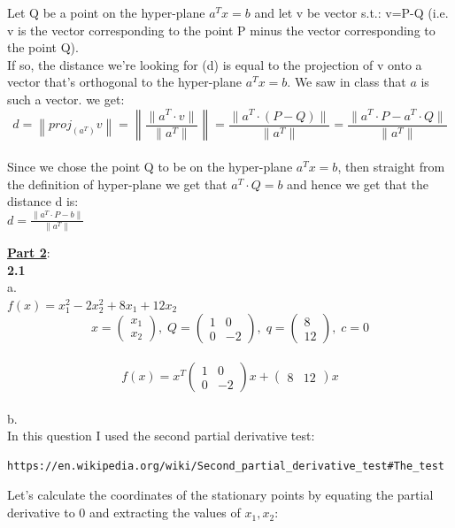 \documentclass[fleqn]{article}
\begin{document}
Let Q be a point on the hyper-plane $a^Tx=b$ and let v be vector s.t.: v=P-Q (i.e. v is the vector corresponding to the point P minus the vector corresponding to the point Q). \\
If so, the distance we're looking for (d) is equal to the projection of v onto a vector that's orthogonal to the hyper-plane $a^Tx=b$. We saw in class that $a$ is such a vector. we get: \\
\[
d = \left\| proj_{(a^T)}v\right\| = \left\| \frac{\|a^T \cdot v\|}{\|a^T\|} \right\|
=
\frac{\|a^T \cdot (P-Q)\|}{\|a^T\|} 
=
\frac{\|a^T \cdot P - a^T \cdot Q \|}{\|a^T\|} 
\] \\
Since we chose the point Q to be on the hyper-plane $a^Tx=b$, then straight from the definition of hyper-plane we get that $a^T \cdot Q=b$ and hence we get that the distance d is: \\

$d = \frac{\|a^T \cdot P - b \|}{\|a^T\|} $

\newpage\underline{\textbf{Part 2}}:\\
\textbf{2.1} \\

a. \\

$f(x) = x_1^2 - 2x_2^2 +8x_1 +12x_2$  \\

\[
x = \begin{pmatrix} x_1 \\ x_2 \end{pmatrix}, \;
Q = \begin{pmatrix} 1 & 0 \\ 0 & -2 \end{pmatrix}, \;
q = \begin{pmatrix} 8 \\ 12 \end{pmatrix}, \; 
c=0
\] \\
\[
f(x) = x^T \begin{pmatrix} 1 & 0 \\ 0 & -2 \end{pmatrix} x + \begin{pmatrix} 8 & 12 \end{pmatrix} x
\] \\

b. \\
In this question I used the second partial derivative test:
\begin{verbatim}
https://en.wikipedia.org/wiki/Second_partial_derivative_test#The_test
\end{verbatim}
Let's calculate the coordinates of the stationary points by equating the partial derivative to 0 and extracting the values of $x_1, x_2$:\\
\end{document}
